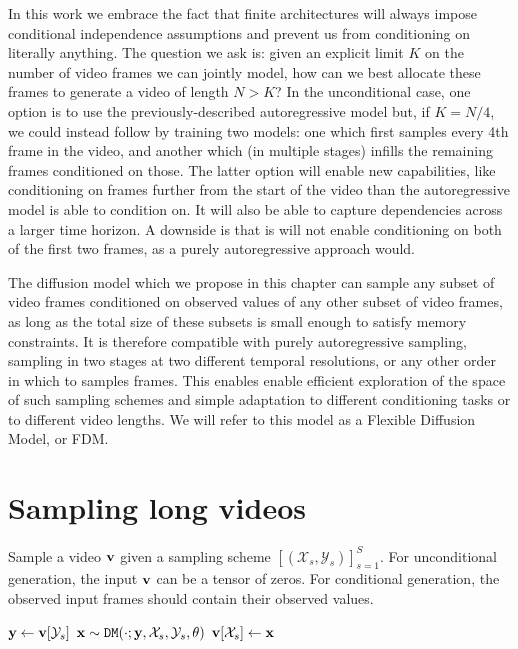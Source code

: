 In this work we embrace the fact that finite architectures will always impose conditional independence assumptions and prevent us from conditioning on literally anything. The question we ask is: given an explicit limit $K$ on the number of video frames we can jointly model, how can we best allocate these frames to generate a video of length $N > K$? In the unconditional case, one option is to use the previously-described autoregressive model but, if $K=N/4$, we could instead follow \citet{ho2022video} by training two models: one which first samples every 4th frame in the video, and another which (in multiple stages) infills the remaining frames conditioned on those. The latter option will enable new capabilities, like conditioning on frames further from the start of the video than the autoregressive model is able to condition on. It will also be able to capture dependencies across a larger time horizon. A downside is that is will not enable conditioning on both of the first two frames, as a purely autoregressive approach would.

The diffusion model which we propose in this chapter can sample any subset of video frames conditioned on observed values of any other subset of video frames, as long as the total size of these subsets is small enough to satisfy memory constraints. It is therefore compatible with purely autoregressive sampling, sampling in two stages at two different temporal resolutions, or any other order in which to samples frames. This enables enable efficient exploration of the space of such sampling schemes and simple adaptation to different conditioning tasks or to different video lengths. We will refer to this model as a Flexible Diffusion Model, or FDM.

\section{Sampling long videos}


\begin{algorithm}[t]
    \centering
    \caption{Sample a video $\rvv$ given a sampling scheme $[(\mathcal{X}_s,\mathcal{Y}_s)]_{s=1}^S$. For unconditional generation, the input $\rvv$ can be a tensor of zeros. For conditional generation, the observed input frames should contain their observed values.}
    \label{alg:sampling}
    \footnotesize
    \begin{algorithmic}[1]
            \State ${\mathbf{y}} \gets {\mathbf{v}} [\mathcal{Y}_s]$ 
            \State ${\mathbf{x}} \sim  \texttt{DM}(\cdot; {\mathbf{y}}, \mathcal{X}_s, \mathcal{Y}_s, \theta)$  
            \State ${\mathbf{v}} [\mathcal{X}_s] \gets {\mathbf{x}}$ 
        \EndFor
    \EndProcedure
    \State \Return {$\rvv$}
    \end{algorithmic}
\end{algorithm}


